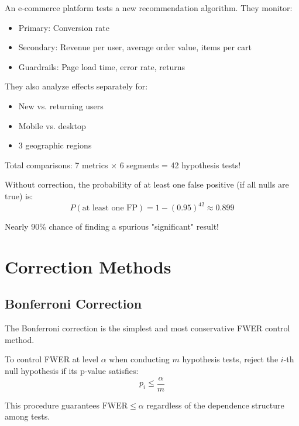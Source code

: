 \begin{example}
An e-commerce platform tests a new recommendation algorithm. They monitor:
\begin{itemize}
    \item Primary: Conversion rate
    \item Secondary: Revenue per user, average order value, items per cart
    \item Guardrails: Page load time, error rate, returns
\end{itemize}

They also analyze effects separately for:
\begin{itemize}
    \item New vs. returning users
    \item Mobile vs. desktop
    \item 3 geographic regions
\end{itemize}

Total comparisons: 7 metrics $\times$ 6 segments = 42 hypothesis tests!

Without correction, the probability of at least one false positive (if all nulls are true) is:
\begin{equation}
P(\text{at least one FP}) = 1 - (0.95)^{42} \approx 0.899
\end{equation}

Nearly 90\% chance of finding a spurious "significant" result!
\end{example}

\section{Correction Methods}

\subsection{Bonferroni Correction}

The Bonferroni correction is the simplest and most conservative FWER control method.

\begin{theorem}
To control FWER at level $\alpha$ when conducting $m$ hypothesis tests, reject the $i$-th null hypothesis if its p-value satisfies:
\begin{equation}
p_i \leq \frac{\alpha}{m}
\end{equation}

This procedure guarantees $\text{FWER} \leq \alpha$ regardless of the dependence structure among tests.
\end{theorem}

